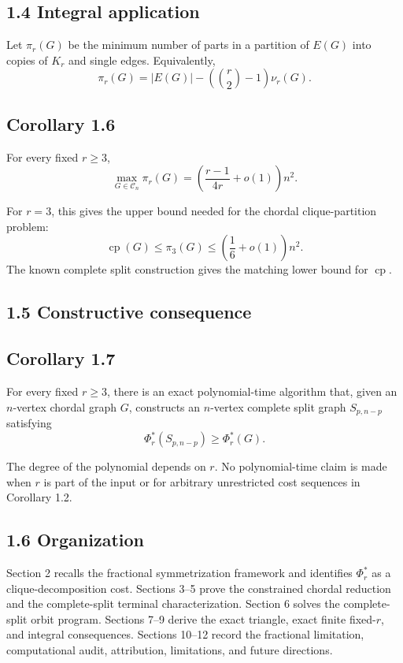\documentclass[11pt,a4paper]{article}
\begin{document}
\subsection{1.4 Integral application}\label{integral-application}

Let \(\pi_r(G)\) be the minimum number of parts in a partition of \(E(G)\)
into copies of \(K_r\) and single edges. Equivalently,
\[
\pi_r(G)
=
|E(G)|
-
\left(\binom r2-1\right)\nu_r(G).
\tag{1.15}
\]

\subsection{Corollary 1.6}\label{corollary-1.6}

For every fixed \(r\ge3\),
\[
\boxed{
\max_{G\in\mathcal C_n}\pi_r(G)
=
\left(\frac{r-1}{4r}+o(1)\right)n^2.
}
\tag{1.16}
\]

For \(r=3\), this gives the upper bound needed for the chordal
clique-partition problem:
\[
\operatorname{cp}(G)
\le
\pi_3(G)
\le
\left(\frac16+o(1)\right)n^2.
\tag{1.17}
\]
The known complete split construction gives the matching lower bound for
\(\operatorname{cp}\).

\subsection{1.5 Constructive consequence}\label{constructive-consequence}

\subsection{Corollary 1.7}\label{corollary-1.7}

For every fixed \(r\ge3\), there is an exact polynomial-time algorithm that,
given an \(n\)-vertex chordal graph \(G\), constructs an \(n\)-vertex
complete split graph \(S_{p,n-p}\) satisfying
\[
\Phi_r^*(S_{p,n-p})\ge\Phi_r^*(G).
\tag{1.18}
\]

The degree of the polynomial depends on \(r\). No polynomial-time claim is
made when \(r\) is part of the input or for arbitrary unrestricted cost
sequences in Corollary 1.2.

\subsection{1.6 Organization}\label{organization}

Section 2 recalls the fractional symmetrization framework and identifies
\(\Phi_r^*\) as a clique-decomposition cost. Sections 3--5 prove the
constrained chordal reduction and the complete-split terminal
characterization. Section 6 solves the complete-split orbit program.
Sections 7--9 derive the exact triangle, exact finite fixed-\(r\), and
integral consequences. Sections 10--12 record the fractional limitation,
computational audit, attribution, limitations, and future directions.
\end{document}
